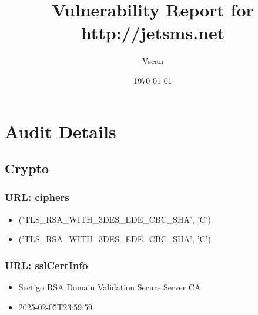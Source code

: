 \documentclass{article}
\begin{document}
\title{Vulnerability Report for http://jetsms.net}
\author{Vscan}
\date{\today}
\maketitle

\section{Audit Details}

\subsection{Crypto}

\subsubsection{URL: \url{ciphers}}
\begin{itemize}
\item ('TLS_RSA_WITH_3DES_EDE_CBC_SHA', 'C')
\item ('TLS_RSA_WITH_3DES_EDE_CBC_SHA', 'C')
\end{itemize}

\subsubsection{URL: \url{sslCertInfo}}
\begin{itemize}
\item Sectigo RSA Domain Validation Secure Server CA
\item 2025-02-05T23:59:59
\end{itemize}
\end{document}
